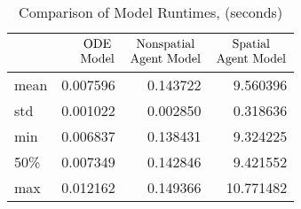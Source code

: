\begin{table}[h]
\caption{Comparison of Model Runtimes, (seconds)}
\label{model_runtimes}
\begin{tabular}{lrrr}
\toprule
 & $\mqty{\text{ODE}\\\text{Model}}$ & $\mqty{\text{Nonspatial}\\\text{Agent Model}}$ & $\mqty{\text{Spatial}\\\text{Agent Model}}$ \\
\midrule
mean & 0.007596 & 0.143722 & 9.560396 \\
std & 0.001022 & 0.002850 & 0.318636 \\
min & 0.006837 & 0.138431 & 9.324225 \\
50\% & 0.007349 & 0.142846 & 9.421552 \\
max & 0.012162 & 0.149366 & 10.771482 \\
\bottomrule
\end{tabular}
\end{table}
